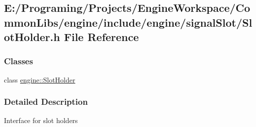 \hypertarget{a00141}{}\subsection{E\+:/\+Programing/\+Projects/\+Engine\+Workspace/\+Common\+Libs/engine/include/engine/signal\+Slot/\+Slot\+Holder.h File Reference}
\label{a00141}
\subsubsection*{Classes}
\begin{DoxyCompactItemize}
\item 
class \hyperlink{a00070}{engine\+::\+Slot\+Holder}
\end{DoxyCompactItemize}


\subsubsection{Detailed Description}
Interface for slot holders 